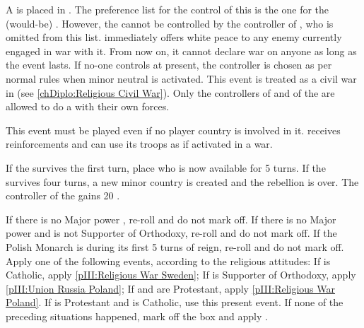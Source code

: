 






\phevnt
\aparag A \REVOLT \faceplus is placed in \provinceCorsica. The preference list
for the control of this \REVOLT is the one for the (would-be) \paysCorse.
However, the \REVOLT cannot be controlled by the controller of \paysGenes, who
is omitted from this list.
\aparag \paysGenes immediately offers white peace to any enemy currently
engaged in war with it.  From now on, it cannot declare war on anyone as long
as the event lasts.
\aparag If no-one controls \paysGenes at present, the controller is chosen as
per normal rules when minor neutral is activated.
\aparag This event is treated as a civil war in \paysGenes (see
\ref{chDiplo:Religious Civil War}). Only the controllers of \paysGenes and of
the \REVOLT are allowed to do a  with their own
forces.

\phadm
\aparag This event must be played even if no player country is involved in
it. \paysGenes receives reinforcements and can use its troops as if activated
in a war.

\phinter
\aparag If the \REVOLT survives the first turn, place \leaderSampiero who is
now available for 5 turns.
\aparag If the \REVOLT survives four turns, a new minor country \paysCorse is
created and the rebellion is over. The controller of the \REVOLT gains 20 \PV.





\condition{}
\aparag If there is no Major power \POL, re-roll and do not mark off.
\aparag If there is no Major power \SUE and \POL is not Supporter of
Orthodoxy, re-roll and do not mark off.
\aparag If the Polish Monarch is  during its first 5 turns
of reign, re-roll and do not mark off.
\aparag Apply one of the following events, according to the religious
attitudes:
\bparag If \SUE is Catholic, apply \ref{pIII:Religious War Sweden};
\bparag If \POL is Supporter of Orthodoxy, apply \ref{pIII:Union Russia
  Poland};
\bparag If \POL and \SUE are Protestant, apply \ref{pIII:Religious War
  Poland}.
\bparag If \SUE is Protestant and \POL is Catholic, use this present event.
\bparag If none of the preceding situations happened, mark off the box and
apply \RD.

